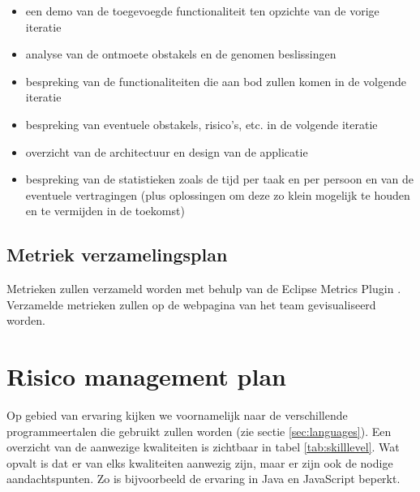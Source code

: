 \begin{itemize}
\item een demo van de toegevoegde functionaliteit ten opzichte van de vorige iteratie
\item analyse van de ontmoete obstakels en de genomen beslissingen
\item bespreking van de functionaliteiten die aan bod zullen komen in de volgende iteratie
\item bespreking van eventuele obstakels, risico’s, etc. in de volgende iteratie
\item overzicht van de architectuur en design van de applicatie
\item bespreking van de statistieken zoals de tijd per taak en per persoon en van de eventuele vertragingen (plus oplossingen om deze zo klein mogelijk te houden en te vermijden in de toekomst)
\end{itemize}

\subsection{Metriek verzamelingsplan}
Metrieken zullen verzameld worden met behulp van de Eclipse Metrics Plugin \cite{EclipseMetricsPlugin}. Verzamelde metrieken zullen op de webpagina van het team gevisualiseerd worden.

\section{Risico management plan}
Op gebied van ervaring kijken we voornamelijk naar de verschillende programmeertalen die gebruikt zullen worden (zie sectie \ref{sec:languages}). Een overzicht van de aanwezige kwaliteiten is zichtbaar in tabel \ref{tab:skilllevel}. Wat opvalt is dat er van elks kwaliteiten aanwezig zijn, maar er zijn ook de nodige aandachtspunten. Zo is bijvoorbeeld de ervaring in Java en JavaScript beperkt.

